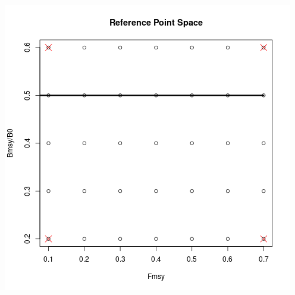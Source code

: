 \documentclass[ xcolor = pdftex, dvipsnames, table ]{beamer}
\begin{document}
%
\begin{frame}
\begin{center}
\includegraphics[height=1\textheight]{shaeferDat.png}
\end{center}
\end{frame}
\end{document}

